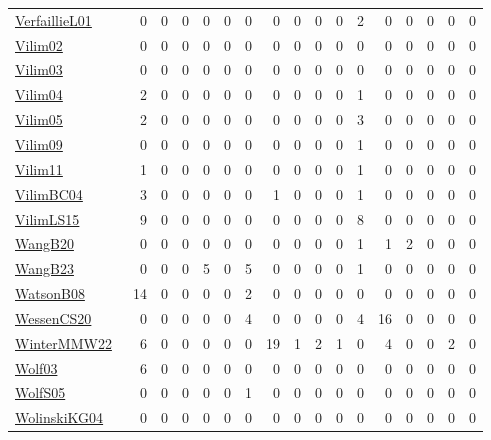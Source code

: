 {\begin{longtable}{l*{16}{r}}
\href{papers/VerfaillieL01.pdf}{VerfaillieL01}~\cite{VerfaillieL01} & 0 & 0 & 0 & 0 & 0 & 0 & 0 & 0 & 0 & 0 & 2 & 0 & 0 & 0 & 0 & 0\\
\href{papers/Vilim02.pdf}{Vilim02}~\cite{Vilim02} & 0 & 0 & 0 & 0 & 0 & 0 & 0 & 0 & 0 & 0 & 0 & 0 & 0 & 0 & 0 & 0\\
\href{papers/Vilim03.pdf}{Vilim03}~\cite{Vilim03} & 0 & 0 & 0 & 0 & 0 & 0 & 0 & 0 & 0 & 0 & 0 & 0 & 0 & 0 & 0 & 0\\
\href{papers/Vilim04.pdf}{Vilim04}~\cite{Vilim04} & 2 & 0 & 0 & 0 & 0 & 0 & 0 & 0 & 0 & 0 & 1 & 0 & 0 & 0 & 0 & 0\\
\href{papers/Vilim05.pdf}{Vilim05}~\cite{Vilim05} & 2 & 0 & 0 & 0 & 0 & 0 & 0 & 0 & 0 & 0 & 3 & 0 & 0 & 0 & 0 & 0\\
\href{papers/Vilim09.pdf}{Vilim09}~\cite{Vilim09} & 0 & 0 & 0 & 0 & 0 & 0 & 0 & 0 & 0 & 0 & 1 & 0 & 0 & 0 & 0 & 0\\
\href{papers/Vilim11.pdf}{Vilim11}~\cite{Vilim11} & 1 & 0 & 0 & 0 & 0 & 0 & 0 & 0 & 0 & 0 & 1 & 0 & 0 & 0 & 0 & 0\\
\href{papers/VilimBC04.pdf}{VilimBC04}~\cite{VilimBC04} & 3 & 0 & 0 & 0 & 0 & 0 & 1 & 0 & 0 & 0 & 1 & 0 & 0 & 0 & 0 & 0\\
\href{papers/VilimLS15.pdf}{VilimLS15}~\cite{VilimLS15} & 9 & 0 & 0 & 0 & 0 & 0 & 0 & 0 & 0 & 0 & 8 & 0 & 0 & 0 & 0 & 0\\
\href{papers/WangB20.pdf}{WangB20}~\cite{WangB20} & 0 & 0 & 0 & 0 & 0 & 0 & 0 & 0 & 0 & 0 & 1 & 1 & 2 & 0 & 0 & 0\\
\href{papers/WangB23.pdf}{WangB23}~\cite{WangB23} & 0 & 0 & 0 & 5 & 0 & 5 & 0 & 0 & 0 & 0 & 1 & 0 & 0 & 0 & 0 & 0\\
\href{papers/WatsonB08.pdf}{WatsonB08}~\cite{WatsonB08} & 14 & 0 & 0 & 0 & 0 & 2 & 0 & 0 & 0 & 0 & 0 & 0 & 0 & 0 & 0 & 0\\
\href{papers/WessenCS20.pdf}{WessenCS20}~\cite{WessenCS20} & 0 & 0 & 0 & 0 & 0 & 4 & 0 & 0 & 0 & 0 & 4 & 16 & 0 & 0 & 0 & 0\\
\href{papers/WinterMMW22.pdf}{WinterMMW22}~\cite{WinterMMW22} & 6 & 0 & 0 & 0 & 0 & 0 & 19 & 1 & 2 & 1 & 0 & 4 & 0 & 0 & 2 & 0\\
\href{papers/Wolf03.pdf}{Wolf03}~\cite{Wolf03} & 6 & 0 & 0 & 0 & 0 & 0 & 0 & 0 & 0 & 0 & 0 & 0 & 0 & 0 & 0 & 0\\
\href{papers/WolfS05.pdf}{WolfS05}~\cite{WolfS05} & 0 & 0 & 0 & 0 & 0 & 1 & 0 & 0 & 0 & 0 & 0 & 0 & 0 & 0 & 0 & 0\\
\href{papers/WolinskiKG04.pdf}{WolinskiKG04}~\cite{WolinskiKG04} & 0 & 0 & 0 & 0 & 0 & 0 & 0 & 0 & 0 & 0 & 0 & 0 & 0 & 0 & 0 & 0\\

\end{longtable}}
